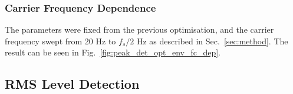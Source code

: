 \documentclass[../main2.tex]{subfiles}
\begin{document}
\subsubsection{Carrier Frequency Dependence}
The parameters were fixed from the previous optimisation, and the carrier frequency swept from 20 Hz to $f_s/2$ Hz as described in Sec.~\ref{sec:method}. The result can be seen in Fig.~\ref{fig:peak_det_opt_env_fc_dep}.

\subsection{RMS Level Detection}
\end{document}
